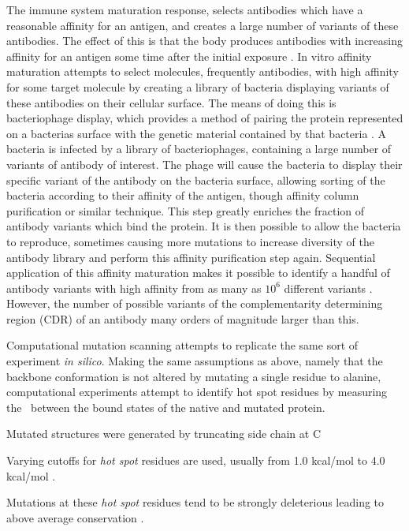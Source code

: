 The immune system maturation response, selects antibodies which have a reasonable affinity for an antigen, and creates a large number of variants of these antibodies. 
The effect of this is that the body produces antibodies with increasing affinity for an antigen some time after the initial exposure \cite{griffiths1984somatic}.
In vitro affinity maturation attempts to select molecules, frequently antibodies, with high affinity for some target molecule by creating a library of bacteria displaying variants of these antibodies on their cellular surface.
The means of doing this is bacteriophage display, which provides a method of pairing the protein represented on a bacterias surface with the genetic material contained by that bacteria \cite{smith1985filamentous}.
A bacteria is infected by a library of bacteriophages, containing a large number of variants of antibody of interest.
The phage will cause the bacteria to display their specific variant of the antibody on the bacteria surface, allowing sorting of the bacteria according to their affinity of the antigen, though affinity column purification or similar technique.
This step greatly enriches the fraction of antibody variants which bind the protein.
It is then possible to allow the bacteria to reproduce, sometimes causing more mutations to increase diversity of the antibody library and perform this affinity purification step again.
Sequential application of this affinity maturation makes it possible to identify a handful of antibody variants with high affinity from as many as $10^{6}$ different variants \cite{gram1992vitro,hawkins1992selection}.
However, the number of possible variants of the complementarity determining region (CDR) of an antibody many orders of magnitude larger than this.

Computational mutation scanning attempts to replicate the same sort of experiment {\it in silico}.
Making the same assumptions as above, namely that the backbone conformation is not altered by mutating a single residue to alanine, computational experiments attempt to identify hot spot residues by measuring the \ddg\ between the bound states of the native and mutated protein.

Mutated structures were generated by truncating side chain at C\subscript{$\gamma$} 
\cite{massova1999computational}

Varying cutoffs for {\it hot spot} residues are used, usually from 1.0 kcal/mol \cite{kortemme2002simple} to 4.0 kcal/mol \cite{pons1999energetic}.

Mutations at these {\it hot spot} residues tend to be strongly deleterious leading to above average conservation  \cite{hu2000conservation,lichtarge1996evolutionary}.

